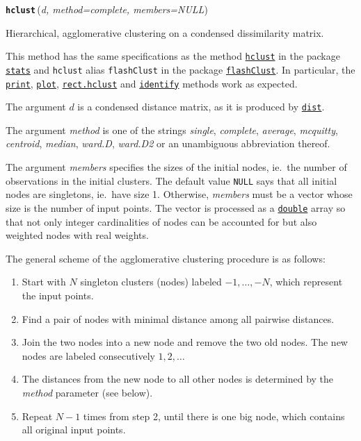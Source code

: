 \documentclass[fontsize=10pt,paper=letter,BCOR=-6mm,DIV=8]{scrartcl}
\makeatletter
\newcommand*\q{\textquotesingle}
\newcommand*\hclust{\href{https://stat.ethz.ch/R-manual/R-patched/library/stats/html/hclust.html}{\texttt{hclust}}}
\newcommand*\stats{\href{https://stat.ethz.ch/R-manual/R-patched/library/stats/html/00Index.html}{\texttt{stats}}}
\newcommand*\flashClustPack{\href{https://CRAN.R-project.org/package=flashClust}{\texttt{flashClust}}}
\newcommand*\dist{\href{https://stat.ethz.ch/R-manual/R-patched/library/stats/html/dist.html}{\texttt{dist}}}
\newcommand*\print{\href{https://stat.ethz.ch/R-manual/R-patched/library/base/html/print.html}{\texttt{print}}}
\newcommand*\plot{\href{https://stat.ethz.ch/R-manual/R-patched/library/graphics/html/plot.html}{\texttt{plot}}}
\newcommand*\identify{\href{https://stat.ethz.ch/R-manual/R-patched/library/stats/html/identify.hclust.html}{\texttt{identify}}}
\newcommand*\rect{\href{https://stat.ethz.ch/R-manual/R-patched/library/stats/html/rect.hclust.html}{\texttt{rect.hclust}}}
\newcommand*\double{\href{https://stat.ethz.ch/R-manual/R-patched/library/base/html/double.html}{\texttt{double}}}
\newenvironment{methods}{%
  \list{}{\labelwidth\z@
    \itemindent-\leftmargin
    \let\makelabel\methodslabel}%
}{%
  \endlist
}
\newcommand*{\methodslabel}[1]{%
  \hbox to \textwidth{\hspace{\labelsep}%
  \normalfont\bfseries\ttfamily
  #1\hskip-\labelsep\hfill}%
}
\makeatother
\begin{document}
\begin{methods}
\item [\normalfont\texttt{\textbf{hclust}}\,(\textit{d, method=\q complete\q, members=NULL})]
\label{hclust}

Hierarchical, agglomerative clustering on a condensed dissimilarity matrix.

This method has the same specifications as the method \hclust{} in the package \stats{} and \texttt{hclust} alias \texttt{flashClust} in the package \flashClustPack{}. In particular, the \print{}, \plot{}, \rect{} and \identify{} methods work as expected.

The argument $d$ is a condensed distance matrix, as it is produced by \dist.

The argument \textit{method} is one of the strings \textit{\q single\q}, \textit{\q complete\q}, \textit{\q average\q}, \textit{\q mcquitty\q}, \textit{\q centroid\q}, \textit{\q median\q}, \textit{\q ward.D\q}, \textit{\q ward.D2\q} or an unambiguous abbreviation thereof.

The argument \textit{members} specifies the sizes of the initial nodes, ie.\ the number of observations in the initial clusters. The default value \texttt{NULL} says that all initial nodes are singletons, ie.\ have size 1. Otherwise, \textit{members} must be a vector whose size is the number of input points. The vector is processed as a \double{} array so that not only integer cardinalities of nodes can be accounted for but also weighted nodes with real weights.

The general scheme of the agglomerative clustering procedure is as follows:
\begin{enumerate}
\item Start with $N$ singleton clusters (nodes) labeled $-1,\ldots, -N$, which represent the input points.
\item Find a pair of nodes with minimal distance among all pairwise distances.
\item Join the two nodes into a new node and remove the two old nodes. The new nodes are labeled consecutively $1,2,\ldots$
\item The distances from the new node to all other nodes is determined by the \textit{method} parameter (see below).
\item Repeat $N-1$ times from step 2, until there is one big node, which contains all original input points.
\end{enumerate}


\end{methods}
\end{document}
